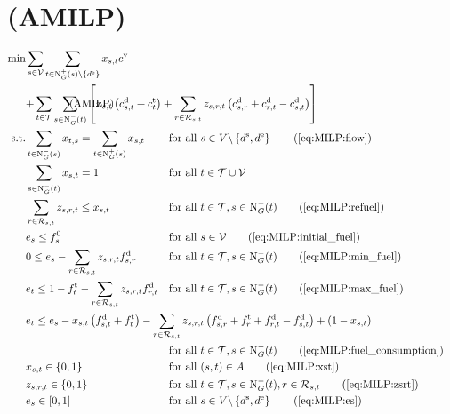 \newpage
\section{(AMILP)}

\begin{align}
	\min & \sum_{s\in\mathcal{V}} \sum_{t\in\Nout(s)\backslash\{d^{\operatorname{e}}\}} x_{s,t}\cv \nonumber \\
	& \omit\rlap{$\displaystyle{ + \sum_{t\in\mathcal{T}} \sum_{s\in\Nin(t)} \left[x_{s,t}\left(\cd_{s,t}+\ct_t\right) + \sum_{r\in\Rst} z_{s,r,t}\left(\cd_{s,r}+\cd_{r,t}-\cd_{s,t}\right)\right]}$} \tag{AMILP} \label{eq:AMILP} \\
	\text{s.t.} & \sum_{t\in\Nin(s)} x_{t,s} = \sum_{t\in\Nout(s)} x_{s,t} & & \text{for all } s\in V\backslash\left\{d^{\operatorname{s}},d^{\operatorname{e}}\right\} \tag{\ref{eq:MILP:flow}} \\
	& \sum_{s\in\Nin(t)} x_{s,t} = 1 & & \text{for all } t\in\mathcal{T}\cup\mathcal{V} \\
	& \sum_{r\in\Rst} z_{s,r,t} \leq x_{s,t} & & \text{for all } t\in\mathcal{T}, s\in\Nin(t) \tag{\ref{eq:MILP:refuel}} \\
	& e_s \leq f_s^0 & & \text{for all } s\in\mathcal{V} \tag{\ref{eq:MILP:initial_fuel}} \\
	& 0 \leq e_s - \sum_{r\in\Rst} z_{s,r,t}\fd_{s,r} & & \text{for all } t\in\mathcal{T}, s\in\Nin(t) \tag{\ref{eq:MILP:min_fuel}} \\
	& e_t \leq 1 - \ft_t - \sum_{r\in\Rst} z_{s,r,t}\fd_{r,t} & & \text{for all } t\in\mathcal{T}, s\in\Nin(t) \tag{\ref{eq:MILP:max_fuel}} \\
	& \omit\rlap{$\displaystyle{e_t \leq e_s - x_{s,t}\left(f_{s,t}^{\operatorname{d}}+f_t^{\operatorname{t}}\right) - \sum_{r\in\Rst} z_{s,r,t}\left(\fd_{s,r}+\ft_r+\fd_{r,t}-\fd_{s,t}\right) + \left(1-x_{s,t}\right)}$} \nonumber \\
	& & & \text{for all } t\in\mathcal{T}, s\in\Nin(t) \tag{\ref{eq:MILP:fuel_consumption}} \\
	& x_{s,t}\in\{0,1\} & & \text{for all } (s,t)\in A \tag{\ref{eq:MILP:xst}} \\
	& z_{s,r,t}\in\{0,1\} & & \text{for all } t\in\mathcal{T},s\in\Nin(t),r\in\Rst \tag{\ref{eq:MILP:zsrt}} \\
	& e_s\in[0,1] & & \text{for all } s\in V\backslash\left\{d^{\operatorname{s}},d^{\operatorname{e}}\right\} \tag{\ref{eq:MILP:es}}
\end{align}

\newpage
